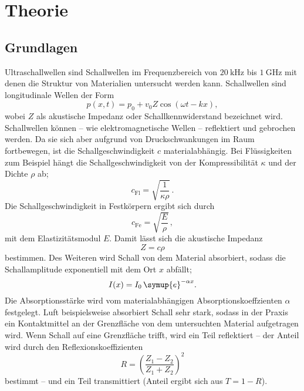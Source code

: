 \section{Theorie}
\label{sec:Theorie}

\subsection{Grundlagen}
Ultraschallwellen sind Schallwellen im Frequenzbereich von $\SI{20}{\kilo\hertz}$ bis
$\SI{1}{\giga\hertz}$ mit denen die Struktur von Materialien untersucht werden kann.
Schallwellen sind longitudinale Wellen der Form
\begin{equation}
	p(x,t) = p_0 + v_0 Z \cos(\omega t - kx) \mathrm{,}
\end{equation}
wobei $Z$ als akustische Impedanz oder Schallkennwiderstand bezeichnet wird.
Schallwellen können -- wie elektromagnetische Wellen -- reflektiert und gebrochen werden.
Da sie sich aber aufgrund von Druckschwankungen im Raum fortbewegen, ist die
Schallgeschwindigkeit $c$ materialabhängig. Bei Flüssigkeiten zum Beispiel hängt die
Schallgeschwindigkeit von der Kompressibilität $\kappa$ und der Dichte $\rho$ ab;
\begin{equation}
	c_{\mathrm{Fl}} = \sqrt{\frac{1}{\kappa\rho}} \, \mathrm{.}
\end{equation}
Die Schallgeschwindigkeit in Festkörpern ergibt sich durch
\begin{equation}
	c_{\mathrm{Fe}} = \sqrt{\frac{E}{\rho}} \, \mathrm{,}
\end{equation}
mit dem Elastizitätsmodul $E$.
Damit lässt sich die akustische Impedanz
\begin{equation}
	Z=c \rho
\end{equation}
bestimmen.
Des Weiteren wird Schall von dem Material absorbiert, sodass die Schallamplitude exponentiell
mit dem Ort $x$ abfällt;
\begin{equation}
	\label{eqn:dampf}
	I(x) = I_0 \, \symup{e}^{-\alpha x} \mathrm{.}
\end{equation}
Die Absorptionsstärke wird vom materialabhängigen Absorptionskoeffzienten $\alpha$ festgelegt.
Luft beispielsweise absorbiert Schall sehr stark, sodass in der Praxis ein Kontaktmittel an der
Grenzfläche von dem untersuchten Material aufgetragen wird.
Wenn Schall auf eine Grenzfläche trifft, wird ein Teil reflektiert -- der Anteil wird durch den
Reflexionskoeffizienten
\begin{equation}
	R =(\frac{Z_1-Z_2}{Z_1+Z_2})^2
\end{equation}
bestimmt -- und ein Teil transmittiert (Anteil ergibt sich aus $T=1-R$).

